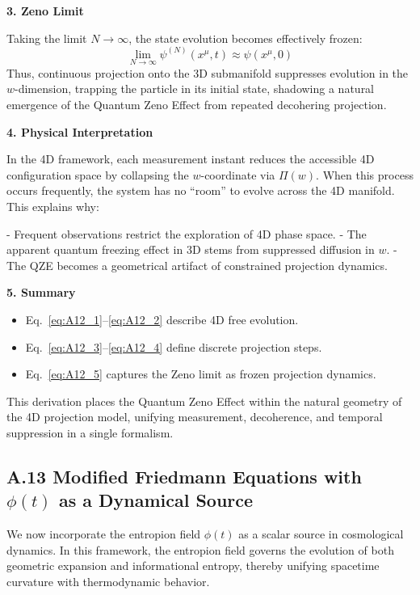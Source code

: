 \documentclass[12pt]{article}
\begin{document}
\bigskip
\textbf{3. Zeno Limit}

Taking the limit \(N \to \infty\), the state evolution becomes effectively frozen:
\begin{equation}
\lim_{N \to \infty} \psi^{(N)}(x^\mu, t) \approx \psi(x^\mu, 0)
\label{eq:A12_5}
\end{equation}
Thus, continuous projection onto the 3D submanifold suppresses evolution in the \(w\)-dimension, trapping the particle in its initial state, shadowing a natural emergence of the Quantum Zeno Effect from repeated decohering projection.

\bigskip
\textbf{4. Physical Interpretation}

In the 4D framework, each measurement instant reduces the accessible 4D configuration space by collapsing the \(w\)-coordinate via \(\Pi(w)\). When this process occurs frequently, the system has no “room” to evolve across the 4D manifold. This explains why:

- Frequent observations restrict the exploration of 4D phase space.
- The apparent quantum freezing effect in 3D stems from suppressed diffusion in \(w\).
- The QZE becomes a geometrical artifact of constrained projection dynamics.

\bigskip
\textbf{5. Summary}

\begin{itemize}
  \item Eq.~\eqref{eq:A12_1}–\eqref{eq:A12_2} describe 4D free evolution.
  \item Eq.~\eqref{eq:A12_3}–\eqref{eq:A12_4} define discrete projection steps.
  \item Eq.~\eqref{eq:A12_5} captures the Zeno limit as frozen projection dynamics.
\end{itemize}

This derivation places the Quantum Zeno Effect within the natural geometry of the 4D projection model, unifying measurement, decoherence, and temporal suppression in a single formalism.


\subsection*{A.13 \quad Modified Friedmann Equations with \texorpdfstring{$\phi(t)$}{phi(t)} as a Dynamical Source}
\label{eq:A13}

We now incorporate the entropion field \(\phi(t)\) as a scalar source in cosmological dynamics. In this framework, the entropion field governs the evolution of both geometric expansion and informational entropy, thereby unifying spacetime curvature with thermodynamic behavior.
\end{document}

